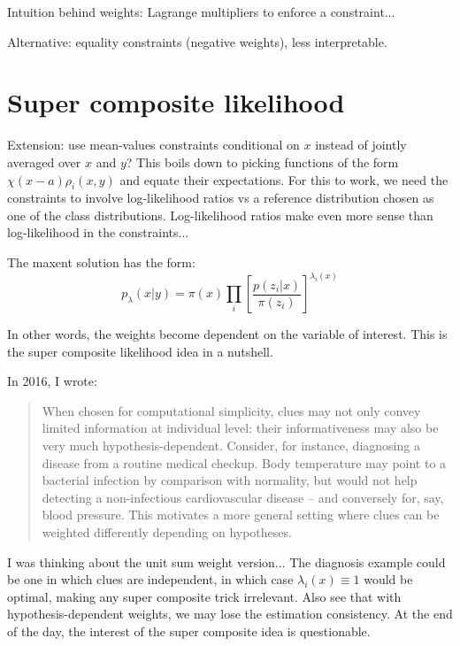 \documentclass[english]{scrartcl}
\begin{document}
Intuition behind weights: Lagrange multipliers to enforce a constraint... 

Alternative: equality constraints (negative weights), less interpretable.


\section{Super composite likelihood}
\label{sec:super}

Extension: use mean-values constraints conditional on $x$ instead of jointly averaged over $x$ and $y$? This boils down to picking functions of the form $\chi(x-a)\rho_i(x,y)$ and equate their expectations. For this to work, we need the constraints to involve log-likelihood ratios vs a reference distribution chosen as one of the class distributions. Log-likelihood ratios make even more sense than log-likelihood in the constraints... 

The maxent solution has the form:
$$
p_\lambda(x|y) = \pi(x) \prod_i \left[\frac{p(z_i|x)}{\pi(z_i)}\right]^{\lambda_i(x)}
$$

In other words, the weights become dependent on the variable of interest. This is the super composite likelihood idea in a nutshell.

In 2016, I wrote:
\begin{quote}
When chosen for computational simplicity, clues may not only convey limited information at individual level: their informativeness may also be very much hypothesis-dependent. Consider, for instance, diagnosing a disease from a routine medical checkup. Body temperature may point to a bacterial infection by comparison with normality, but would not help detecting a non-infectious cardiovascular disease -- and conversely for, say, blood pressure.
This motivates a more general setting where clues can be weighted differently depending on hypotheses.
\end{quote}

I was thinking about the unit sum weight version... The diagnosis example could be one in which clues are independent, in which case $\lambda_i(x)\equiv 1$ would be optimal, making any super composite trick irrelevant. Also see that with hypothesis-dependent weights, we may lose the estimation consistency. At the end of the day, the interest of the super composite idea is questionable.
\end{document}
